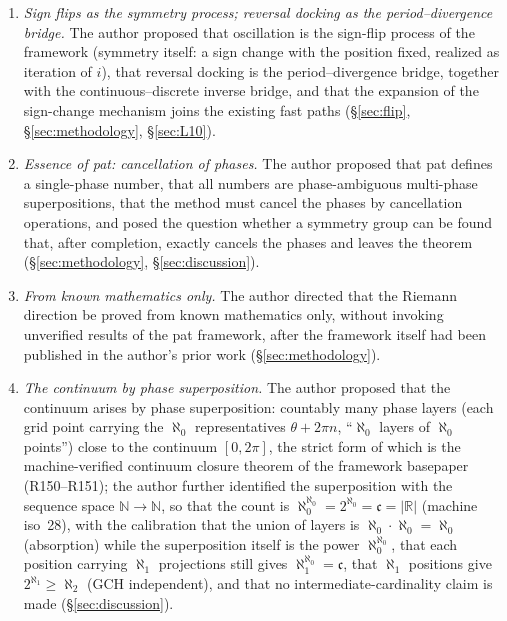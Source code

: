 \documentclass{article}
\begin{document}
\begin{enumerate}
and stable direction), since iterative approximation is itself
finite-reaching-infinite (\S\ref{sec:L11}, \S\ref{sec:growth}).
\item \emph{Sign flips as the symmetry process; reversal docking as the
period--divergence bridge.} The author proposed that oscillation is the
sign-flip process of the framework (symmetry itself: a sign change with the
position fixed, realized as iteration of $i$), that reversal docking is the
period--divergence bridge, together with the continuous--discrete inverse
bridge, and that the expansion of the sign-change mechanism joins the
existing fast paths (\S\ref{sec:flip}, \S\ref{sec:methodology},
\S\ref{sec:L10}).
\item \emph{Essence of pat: cancellation of phases.} The author proposed
that pat defines a single-phase number, that all numbers are
phase-ambiguous multi-phase superpositions, that the method must cancel the
phases by cancellation operations, and posed the question whether a symmetry
group can be found that, after completion, exactly cancels the phases and
leaves the theorem (\S\ref{sec:methodology}, \S\ref{sec:discussion}).
\item \emph{From known mathematics only.} The author directed that the
Riemann direction be proved from known mathematics only, without invoking
unverified results of the pat framework, after the framework itself had
been published in the author's prior work (\S\ref{sec:methodology}).
\item \emph{The continuum by phase superposition.} The author proposed that
the continuum arises by phase superposition: countably many phase layers
(each grid point carrying the $\aleph_0$ representatives $\theta+2\pi n$,
``$\aleph_0$ layers of $\aleph_0$ points'') close to the continuum
$[0,2\pi]$, the strict form of which is the machine-verified continuum
closure theorem of the framework basepaper \cite{patbase} (R150--R151);
the author further identified the superposition with the sequence space
$\mathbb{N}\to\mathbb{N}$, so that the count is
$\aleph_0^{\aleph_0}=2^{\aleph_0}=\mathfrak c=|\mathbb{R}|$ (machine
iso~28), with the calibration that the union of layers is
$\aleph_0\cdot\aleph_0=\aleph_0$ (absorption) while the superposition
itself is the power $\aleph_0^{\aleph_0}$, that each position carrying
$\aleph_1$ projections still gives $\aleph_1^{\aleph_0}=\mathfrak c$,
that $\aleph_1$ positions give $2^{\aleph_1}\ge\aleph_2$ (GCH
independent), and that no intermediate-cardinality claim is made
(\S\ref{sec:discussion}).
\end{enumerate}
\end{document}
